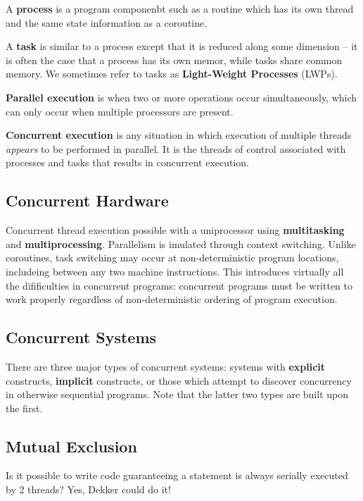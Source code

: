 \documentclass[12pt]{article}
\begin{document}
A {\bf process} is a program componenbt such as a routine which has its own thread and the same state information as a coroutine.

A {\bf task} is similar to a process except that it is reduced along some dimension -- it is often the case that a process has its own memor, while tasks share common memory. We sometimes refer to tasks as {\bf Light-Weight Processes} (LWPs).

{\bf Parallel execution} is when two or more operations occur simultaneously, which can only occur when multiple processors are present.

{\bf Concurrent execution} is any situation in which execution of multiple threads \textit{appears} to be performed in parallel. It is the threads of control associated with processes and tasks that results in concurrent execution.

\subsection{Concurrent Hardware}
Concurrent thread execution possible with a uniprocessor using {\bf multitasking} and {\bf multiprocessing}. Parallelism is imulated through context switching. Unlike coroutines, task switching may occur at non-deterministic program locations, includeing between any two machine instructions. This introduces virtually all the difificulties in concurrent programs: concurrent programs must be written to work properly regardless of non-deterministic ordering of program execution.

\subsection{Concurrent Systems}
There are three major types of concurrent systems: systems with {\bf explicit} constructs, {\bf implicit} constructs, or those which attempt to discover concurrency in otherwise sequential programs. Note that the latter two types are built upon the first.

\subsection{Mutual Exclusion}
Is it possible to write code guaranteeing a statement is always serially executed by 2 threads? Yes, Dekker could do it!
\end{document}
